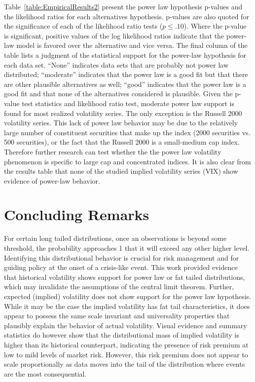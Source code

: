 \documentclass[11pt,a4paper,oldfontcommands]{memoir}
\begin{document}
{Table~\ref{table:EmpiricalResults2} present the power law hypothesis p-values and the likelihood ratios for each alternatives hypothesis. p-values are also quoted for the significance of each of the likelihood ratio tests ($p \leq .10$). Where the p-value is significant, positive values of the log likelihood ratios indicate that the power-law model is favored over the alternative and vice versa. The final column of the table lists a judgment of the statistical support for the power-law hypothesis for each data set. “None” indicates data sets that are probably not power law distributed; “moderate” indicates that the power law is a good fit but that there are other plausible alternatives as well; “good” indicates that the power law is a good fit and that none of the alternatives considered is plausible. Given the p-value test statistics and likelihood ratio test, moderate power law support is found for most realized volatility series. The only exception is the Russell 2000 volatility series. This lack of power law behavior may be due to the relatively large number of constituent securities that make up the index (2000 securities vs. 500 securities), or the fact that the Russell 2000 is a small-medium cap index. Therefore further research can test whether the the power law volatility phenomenon is specific to large cap and concentrated indices. It is also clear from the results table that none of the studied implied volatility series (VIX) show evidence of power-law behavior.




\section{Concluding Remarks}

For certain long tailed distributions, once an observations is beyond some threshold, the probability approaches 1 that it will exceed any other higher level. Identifying this distributional behavior is crucial for risk management and for guiding policy at the onset of a crisis-like event. This work provided evidence that historical volatility shows support for power law or fat tailed distributions, which may invalidate the assumptions of the central limit theorem. Further, expected (implied) volatility does not show support for the power law hypothesis. While it may be the case the implied volatility has fat tail characteristics, it does appear to possess the same scale invariant and universality properties that plausibly explain the behavior of actual volatility. Visual evidence and summary statistics do however show that the distributional mass of implied volatility is higher than its historical counterpart, indicating the presence of risk premium at low to mild levels of market risk. However, this risk premium does not appear to scale proportionally as data moves into the tail of the distribution where events are the most consequential. 

}
\end{document}

